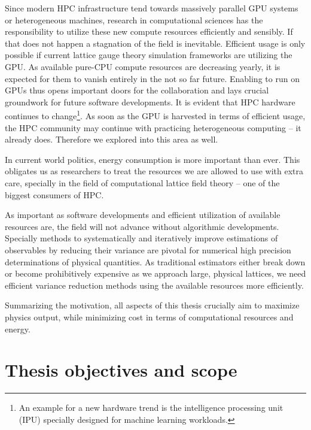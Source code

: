 Since modern HPC infrastructure tend towards massively parallel GPU systems or heterogeneous machines, research in computational sciences has the responsibility to utilize these new compute resources efficiently and sensibly.
If that does not happen a stagnation of the field is inevitable.
Efficient usage is only possible if current lattice gauge theory simulation frameworks are utilizing the GPU.
As available pure-CPU compute resources are decreasing yearly, it is expected for them to vanish entirely in the not so far future.
Enabling \openqxd to run on GPUs thus opens important doors for the \RCstar collaboration and lays crucial groundwork for future software developments.
It is evident that HPC hardware continues to change\footnote{An example for a new hardware trend is the intelligence processing unit~\cite{ipu} (IPU) specially designed for machine learning workloads.}.
As soon as the GPU is harvested in terms of efficient usage, the HPC community may continue with practicing heterogeneous computing -- it already does.
Therefore we explored into this area as well.

In current world politics, energy consumption is more important than ever.
This obligates us as researchers to treat the resources we are allowed to use with extra care, specially in the field of computational lattice field theory -- one of the biggest consumers of HPC.

As important as software developments and efficient utilization of available resources are, the field will not advance without algorithmic developments.
Specially methods to systematically and iteratively improve estimations of observables by reducing their variance are pivotal for numerical high precision determinations of physical quantities.
As traditional estimators either break down or become prohibitively expensive as we approach large, physical lattices, we need efficient variance reduction methods using the available resources more efficiently.

Summarizing the motivation, all aspects of this thesis crucially aim to maximize physics output, while minimizing cost in terms of computational resources and energy.







\section{Thesis objectives and scope}
\label{sec:intro:objectives}

